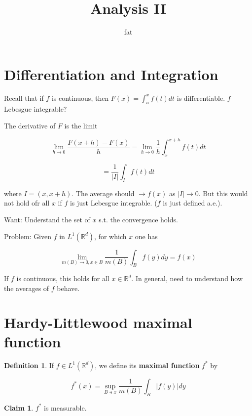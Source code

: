 \documentclass{article}
\title{Analysis II}
\author{fat}
\date{}
\theoremstyle{definition}
\newtheorem{dfn}{Definition}
\newtheorem*{clm}{Claim}
\begin{document}
\maketitle
\thispagestyle{fancy}
\renewcommand{\footrulewidth}{0.4pt}
\cfoot{\thepage}
\renewcommand{\headrulewidth}{0.4pt}

\section{Differentiation and Integration}

\par Recall that if $f$ is continuous, then $F(x)=\int_a^x f(t)dt$ is differentiable. $f$ Lebesgue integrable?

\par The derivative of $F$ is the limit

\begin{equation}
  \lim_{h \to 0} \frac{F(x+h) - F(x)}{h} = \lim_{h \to 0} \frac{1}{h} \int_{x}^{x+h} f(t) dt
\end{equation}

\begin{equation}
  =\frac{1}{|I|} \int_{I} f(t)dt
\end{equation}

\par where $I=(x, x+h)$. The average should $\to f(x)$ as $|I| \to 0$. But this would not hold ofr all $x$ if $f$ is just Lebesgue integrable. ($f$ is just defined a.e.).

\par Want: Understand the set of $x$ s.t. the convergence holds. 

\par Problem: Given $f$ in $L^1 (\mathbb{R}^d)$, for which $x$ one has 

$$ \lim_{m(B) \to 0, x \in B} \frac{1}{m(B)} \int_B f(y) dy = f(x)$$

\par If $f$ is continuous, this holds for all $x \in \mathbb{R}^d$. In general, need to understand how the averages of $f$ behave. 

\section{Hardy-Littlewood maximal function}

\begin{dfn}
	If $f \in L^1(\mathbb{R}^d)$, we define its \textbf{maximal function} $f^*$ by 

  \begin{equation}
    f^*(x) = \sup_{B \ni x} \frac{1}{m(B)} \int_B |f(y)| dy
  \end{equation}
\end{dfn}
\begin{clm} 
    $f^*$ is measurable. 
\end{clm}
\end{document}
